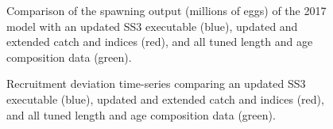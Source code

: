 \documentclass[
]{scrartcl}
\begin{document}
\begin{figure}


\caption{\label{fig-bridge14-comp2}Comparison of the spawning output
(millions of eggs) of the 2017 model with an updated SS3 executable
(blue), updated and extended catch and indices (red), and all tuned
length and age composition data (green).}

\end{figure}%

\begin{figure}


\caption{\label{fig-bridge14-comp11}Recruitment deviation time-series
comparing an updated SS3 executable (blue), updated and extended catch
and indices (red), and all tuned length and age composition data
(green).}

\end{figure}%
\end{document}
